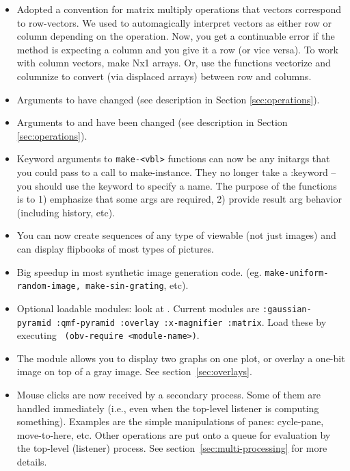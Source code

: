\begin{itemize}
\item Adopted a convention for matrix multiply operations that vectors
correspond to row-vectors.  We used to automagically interpret vectors
as either row or column depending on the operation.  Now, you get a
continuable error if the method is expecting a column and you give it
a row (or vice versa).  To work with column vectors, make Nx1 arrays.
Or, use the functions vectorize and columnize to convert (via
displaced arrays) between row and columns.

\item Arguments to  have changed (see
description in Section \ref{sec:operations}).

\item Arguments to  and  have been
changed (see description in Section \ref{sec:operations}).

\item Keyword arguments to {\tt make-<vbl>} functions can now be any initargs that
you could pass to a call to make-instance.  They no longer take a
:\res keyword -- you should use the  keyword to specify a
name.  The purpose of the functions is to 1) emphasize that some args
are required, 2) provide result arg behavior (including history, etc).

\item You can now create sequences of any type of viewable (not just images)
and can display flipbooks of most types of pictures.

\item Big speedup in most synthetic image generation code. (eg.
{\tt make-uniform-random-image, make-sin-grating}, etc).

\item Optional loadable modules: look at .
Current modules are {\tt :gaussian-pyramid :qmf-pyramid :overlay
:x-magnifier :matrix}.  Load these by executing {\tt
(obv-require <module-name>)}.

\item The  module allows you to display two graphs on one plot,
or overlay a one-bit image on top of a gray image.  See
section~\ref{sec:overlays}.

\item Mouse clicks are now received by a secondary process.  Some of
them are handled immediately (i.e., even when the top-level listener
is computing something).  Examples are the simple manipulations of
panes: cycle-pane, move-to-here, etc.  Other operations are put onto a
queue for evaluation by the top-level (listener) process.  See
section~\ref{sec:multi-processing} for more details.


\end{itemize}
